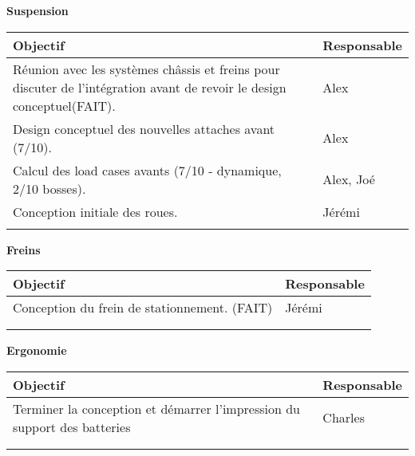 \hfill \break
\textbf{\large Suspension}\\
\begin{tabularx}{\linewidth}{
    |>{\hsize=1.75\hsize}X|%
    >{\hsize=0.25\hsize}X|%
  }
    \hline
    \textbf{Objectif} & \textbf{Responsable} \\\hline
       Réunion avec les systèmes châssis et freins pour discuter de l'intégration avant de revoir le design conceptuel(FAIT).&Alex \\\hline 
       Design conceptuel des nouvelles attaches avant (7/10).&Alex \\\hline
       Calcul des load cases avants (7/10 - dynamique, 2/10 bosses).&Alex, Joé \\\hline  
       Conception initiale des roues. & Jérémi\\\hline
       & \\\hline 
\end{tabularx}



\hfill \break
\textbf{\large Freins}\\
\begin{tabularx}{\linewidth}{
    |>{\hsize=1.75\hsize}X|%
    >{\hsize=0.25\hsize}X|%
  }
    \hline
    \textbf{Objectif} & \textbf{Responsable} \\\hline
     Conception du frein de stationnement. (FAIT) & Jérémi\\\hline 
       & \\\hline
       & \\\hline 
\end{tabularx}


\hfill \break
\textbf{\large Ergonomie}\\
\begin{tabularx}{\linewidth}{
    |>{\hsize=1.75\hsize}X|%
    >{\hsize=0.25\hsize}X|%
  }
    \hline
    \textbf{Objectif} & \textbf{Responsable} \\\hline
       Terminer la conception et démarrer l'impression du support des batteries & Charles\\\hline 
       & \\\hline
       & \\\hline 
\end{tabularx}

